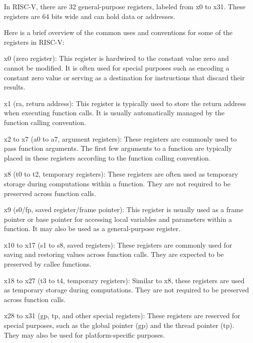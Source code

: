             In RISC-V, there are 32 general-purpose registers, labeled from x0 to x31. These registers are 64 bits wide and can hold data or addresses.
            
            Here is a brief overview of the common uses and conventions for some of the registers in RISC-V:
            
            x0 (zero register): This register is hardwired to the constant value zero and cannot be modified. It is often used for special purposes such as encoding a constant zero value or serving as a destination for instructions that discard their results.
            
            x1 (ra, return address): This register is typically used to store the return address when executing function calls. It is usually automatically managed by the function calling convention.
            
            x2 to x7 (a0 to a7, argument registers): These registers are commonly used to pass function arguments. The first few arguments to a function are typically placed in these registers according to the function calling convention.
            
            x8 (t0 to t2, temporary registers): These registers are often used as temporary storage during computations within a function. They are not required to be preserved across function calls.
            
            x9 (s0/fp, saved register/frame pointer): This register is usually used as a frame pointer or base pointer for accessing local variables and parameters within a function. It may also be used as a general-purpose register.
            
            x10 to x17 (s1 to s8, saved registers): These registers are commonly used for saving and restoring values across function calls. They are expected to be preserved by callee functions.
            
            x18 to x27 (t3 to t4, temporary registers): Similar to x8, these registers are used as temporary storage during computations. They are not required to be preserved across function calls.
            
            x28 to x31 (gp, tp, and other special registers): These registers are reserved for special purposes, such as the global pointer (gp) and the thread pointer (tp). They may also be used for platform-specific purposes.
            
